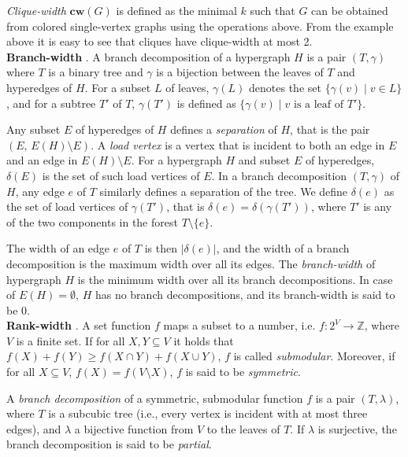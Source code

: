 {\em Clique-width} $\textbf{cw}(G)$ is defined as the minimal $k$ such that $G$ can be obtained from colored single-vertex graphs using the operations above.
From the example above it is easy to see that cliques have clique-width at most 2.\\

\noindent
\textbf{Branch-width} \cite{DBLP:journals/tocl/LodhaOS19, DBLP:conf/sat/SaetherTV14}.
A branch decomposition of a hypergraph $H$ is a pair $(T, \gamma)$ where $T$ is a binary tree and $\gamma$ is a bijection between the leaves of $T$ and hyperedges of $H$.
For a subset $L$ of leaves, $\gamma(L)$ denotes the set $\{ \gamma(v) \; | \; v \in L \}$, and for a subtree $T'$ of $T$, $\gamma(T')$ is defined as $\{ \gamma(v) \; | \; v  \text{ is a leaf of } T' \}$.

Any subset $E$ of hyperedges of $H$ defines a {\em separation} of $H$, that is the pair $(E,\, E(H) \setminus E)$.
A {\em load vertex} is a vertex that is incident to both an edge in $E$ and an edge in $E(H) \setminus E$.
For a hypergraph $H$ and subset $E$ of hyperedges, $\delta(E)$ is the set of such load vertices of $E$.
In a branch decomposition $(T, \gamma)$ of $H$, any edge $e$ of $T$ similarly defines a separation of the tree. 
We define $\delta(e)$ as the set of load vertices of $\gamma(T')$, that is $\delta(e) = \delta(\gamma(T'))$, where $T'$ is any of the two components in the forest $T \setminus \{e\}$.

The width of an edge $e$ of $T$ is then $|\delta(e)|$, and the width of a branch decomposition is the maximum width over all its edges.
The {\em branch-width} of hypergraph $H$ is the minimum width over all its branch decompositions. In case of $E(H) = \emptyset$, $H$ has no branch decompositions, and its branch-width is said to be 0. \\

\noindent
\textbf{Rank-width} \cite{DBLP:journals/fuin/GanianHO13}.
A set function $f$ maps a subset to a number, i.e. $f : 2^V \rightarrow \mathbb{Z}$, where $V$ is a finite set.
If for all $X,Y \subseteq V$ it holds that $f(X)+f(Y) \geq f(X\cap Y) + f(X\cup Y)$, $f$ is called {\em submodular}.
Moreover, if for all $X\subseteq V$, $f(X) = f(V \setminus X)$, $f$ is said to be {\em symmetric}.

A {\em branch decomposition} of a symmetric, submodular function $f$ is a pair $(T, \lambda)$, where $T$ is a subcubic tree (i.e., every vertex is incident with at most three edges), and $\lambda$ a bijective function from $V$ to the leaves of $T$.
If $\lambda$ is surjective, the branch decomposition is said to be {\em partial}.

